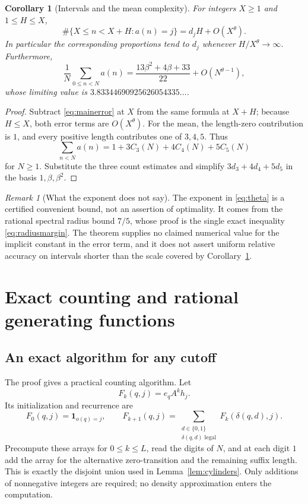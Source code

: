 \documentclass[11pt,a4paper]{article}
\newtheorem{corollary}[theorem]{Corollary}
\theoremstyle{definition}
\theoremstyle{remark}
\newtheorem{remark}[theorem]{Remark}
\begin{document}
\begin{corollary}[Intervals and the mean complexity]\label{cor:mean}
For integers $X\ge1$ and $1\le H\le X$,
\[
 \#\{X\le n<X+H:a(n)=j\}=d_jH+O(X^\theta).
\]
In particular the corresponding proportions tend to $d_j$ whenever
$H/X^\theta\to\infty$. Furthermore,
\begin{equation}\label{eq:mean}
 \frac1N\sum_{0\le n<N}a(n)
 =\frac{13\beta^2+4\beta+33}{22}+O(N^{\theta-1}),
\end{equation}
whose limiting value is $3.83344690925626054335\ldots$.
\end{corollary}
\begin{proof}
Subtract \eqref{eq:mainerror} at $X$ from the same formula at $X+H$;
because $H\le X$, both error terms are $O(X^\theta)$.
For the mean, the length-zero contribution is $1$, and every positive
length contributes one of $3,4,5$. Thus
\[
 \sum_{n<N}a(n)=1+3C_3(N)+4C_4(N)+5C_5(N)
\]
for $N\ge1$. Substitute the three count estimates and simplify
$3d_3+4d_4+5d_5$ in the basis $1,\beta,\beta^2$.
\end{proof}

\begin{remark}[What the exponent does not say]
The exponent in \eqref{eq:theta} is a certified convenient bound, not an
assertion of optimality. It comes from the rational spectral radius bound
$7/5$, whose proof is the single exact inequality
\eqref{eq:radiusmargin}. The theorem supplies no claimed numerical value
for the implicit constant in the error term, and it does not assert uniform
relative accuracy on intervals shorter than the scale covered by
Corollary~\ref{cor:mean}.
\end{remark}

\section{Exact counting and rational generating functions}
\label{sec:computation}

\subsection{An exact algorithm for any cutoff}
The proof gives a practical counting algorithm. Let
\[
 F_k(q,j)=e_qA^kh_j.
\]
Its initialization and recurrence are
\begin{equation}\label{eq:DP}
 F_0(q,j)=\mathbf 1_{o(q)=j},\qquad
 F_{k+1}(q,j)=\sum_{\substack{d\in\{0,1\}\\\delta(q,d)\text{ legal}}}
 F_k(\delta(q,d),j).
\end{equation}
Precompute these arrays for $0\le k\le L$, read the digits of $N$, and at
each digit $1$ add the array for the alternative zero-transition and the
remaining suffix length. This is exactly the disjoint union used in
Lemma~\ref{lem:cylinders}. Only additions of nonnegative integers are
required; no density approximation enters the computation.
\end{document}
